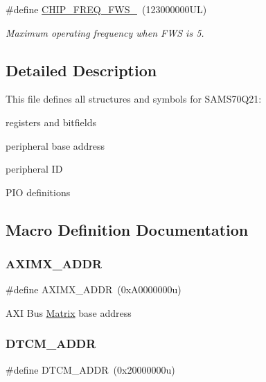 \begin{DoxyCompactItemize}
\mbox{\label{group__SAMS70Q21__definitions_ga3b66824f858591135877b369f98d48a5}} 
\#define \mbox{\hyperlink{group__SAMS70Q21__definitions_ga3b66824f858591135877b369f98d48a5}{C\+H\+I\+P\+\_\+\+F\+R\+E\+Q\+\_\+\+F\+W\+S\+\_}}~(123000000\+U\+L)
\begin{DoxyCompactList}\small\item\em Maximum operating frequency when F\+WS is 5. \end{DoxyCompactList}\end{DoxyCompactItemize}


\subsection{Detailed Description}
This file defines all structures and symbols for S\+A\+M\+S70\+Q21\+:
\begin{DoxyItemize}
\item registers and bitfields
\item peripheral base address
\item peripheral ID
\item P\+IO definitions 
\end{DoxyItemize}

\subsection{Macro Definition Documentation}
\mbox{\label{group__SAMS70Q21__definitions_ga2fb7cc681bf5e7fbce5e3635b72a330a}} 
\subsubsection{\texorpdfstring{AXIMX\_ADDR}{AXIMX\_ADDR}}
{\footnotesize\ttfamily \#define A\+X\+I\+M\+X\+\_\+\+A\+D\+DR~(0x\+A0000000u)}

A\+XI Bus \mbox{\hyperlink{structMatrix}{Matrix}} base address \mbox{\label{group__SAMS70Q21__definitions_ga26626a425f7ebb3a0c2dbc276f0d9f78}} 
\subsubsection{\texorpdfstring{DTCM\_ADDR}{DTCM\_ADDR}}
{\footnotesize\ttfamily \#define D\+T\+C\+M\+\_\+\+A\+D\+DR~(0x20000000u)}

